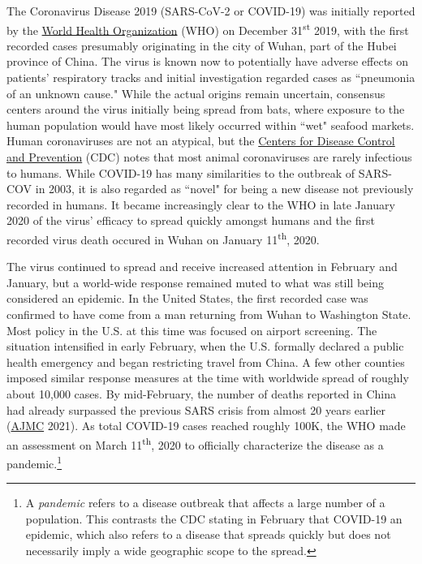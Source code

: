 \documentclass[11pt]{article} %
\begin{document}
The Coronavirus Disease 2019 (SARS-CoV-2 or COVID-19) was initially reported by the \href{https://www.who.int/}{World Health Organization} (WHO) on December 31\textsuperscript{st} 2019, with the first recorded cases presumably originating in the city of Wuhan, part of the Hubei province of China. The virus is known now to potentially have adverse effects on patients' respiratory tracks and initial investigation regarded cases as ``pneumonia of an unknown cause." While the actual origins remain uncertain, consensus centers around the virus initially being spread from bats, where exposure to the human population would have most likely occurred within ``wet" seafood markets. Human coronaviruses are not an atypical, but the \href{https://www.cdc.gov/}{Centers for Disease Control and Prevention} (CDC) notes that most animal coronaviruses are rarely infectious to humans. While COVID-19 has many similarities to the outbreak of SARS-COV in 2003, it is also regarded as ``novel" for being a new disease not previously recorded in humans. It became increasingly clear to the WHO in late January 2020 of the virus' efficacy to spread quickly amongst humans and the first recorded virus death occured in Wuhan on January 11\textsuperscript{th}, 2020.  

The virus continued to spread and receive increased attention in February and January, but a world-wide response remained muted to what was still being considered an epidemic. In the United States, the first recorded case was confirmed to have come from a man returning from Wuhan to Washington State. Most policy in the U.S. at this time was focused on airport screening. The situation intensified in early February, when the U.S. formally declared a public health emergency and began restricting travel from China. A few other counties imposed similar response measures at the time with worldwide spread of roughly about 10,000 cases. By mid-February, the number of deaths reported in China had already surpassed the previous SARS crisis from almost 20 years earlier (\hyperlink{AJMC}{AJMC} 2021). As total COVID-19 cases reached roughly 100K, the WHO made an assessment on March 11\textsuperscript{th}, 2020 to officially characterize the disease as a pandemic.\footnote{A \textit{pandemic} refers to a disease outbreak that affects a large number of a population. This contrasts the CDC stating in February that COVID-19 an epidemic, which also refers to a disease that spreads quickly but does not necessarily imply a wide geographic scope to the spread.} 
\end{document}
